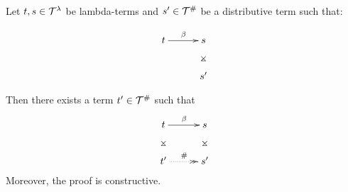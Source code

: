 \begin{lemma}
Let $t,s \in \mathcal{T}^{\lambda}$ be lambda-terms and $s' \in \mathcal{T}^{\mathtt{\#}}$ be a distributive term such that:

\[
\xymatrix@C=1cm{
 \tm \ar[r]^{\beta} & \tmtwo \ar@{}[d]|*=0[@]{\rtimes} \\
                    & \tmtwo' \\
}
\]

Then there exists a term $t' \in \mathcal{T}^{\mathtt{\#}}$ such that
\[
\xymatrix@C=1cm{
 \tm \ar@{}[d]|*=0[@]{\rtimes} \ar[r]^{\beta} & \tmtwo \ar@{}[d]|*=0[@]{\rtimes} \\
 \tm' \ar@{.>>}[r]^{\dist} & \tmtwo' \\
}
\]
Moreover, the proof is constructive.
\end{lemma}
